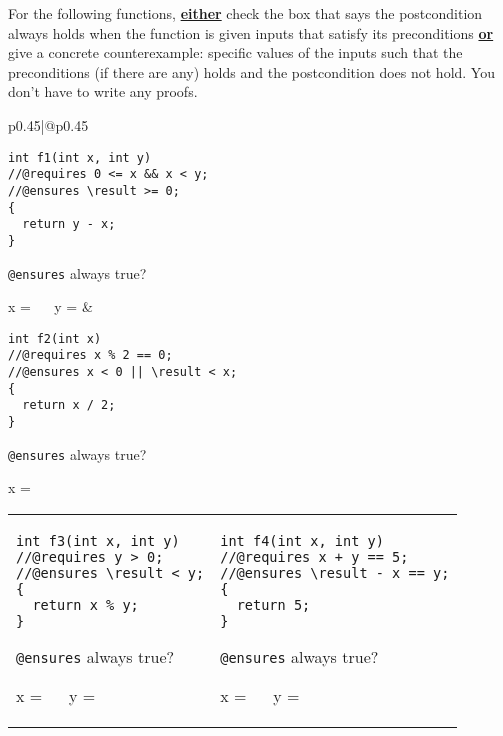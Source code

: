 \clearpage
{}

\bgroup
\newcommand{\ans}[2][1.5em]{\fbox{\rule[-0.25ex]{0em}{3ex}\answer{#1}{#2}}}

For the following functions, \textbf{\underline{either}} check the box
that says the postcondition always holds when the function is given
inputs that satisfy its preconditions \textbf{\underline{or}} give a
concrete counterexample: specific values of the inputs such that the
preconditions (if there are any) holds and the postcondition does not
hold. You don't have to write any proofs.

\begin{tabular}{p{}|@{\hspace{1.5em}}p{}}
\vspace{-12pt}
\begin{lstlisting}
int f1(int x, int y)
//@requires 0 <= x && x < y;
//@ensures \result >= 0;
{
  return y - x;
}
\end{lstlisting}
\lstinline'@ensures' always true? ~ \ans{X}

x = \ans[2.5em]{} ~~  y = \ans[2.5em]{}
&
\vspace{-12pt}
\begin{lstlisting}
int f2(int x)
//@requires x % 2 == 0;
//@ensures x < 0 || \result < x;
{
  return x / 2;
}
\end{lstlisting}
\lstinline'@ensures' always true? ~ \ans{}

x = \ans[2.5em]{0}
\end{tabular}

\bigskip

\begin{tabular}{p{}|@{\hspace{1.5em}}p{}}
\vspace{-12pt}
\begin{lstlisting}
int f3(int x, int y)
//@requires y > 0;
//@ensures \result < y;
{
  return x % y;
}
\end{lstlisting}
\lstinline'@ensures' always true? ~ \ans{X}

x = \ans[2.5em]{} ~~ y = \ans[2.5em]{}
&
\vspace{-12pt}
\begin{lstlisting}
int f4(int x, int y)
//@requires x + y == 5;
//@ensures \result - x == y;
{
  return 5;
}
\end{lstlisting}
\lstinline'@ensures' always true? ~ \ans{X}

x = \ans[2.5em]{} ~~ y = \ans[2.5em]{}
\end{tabular}

